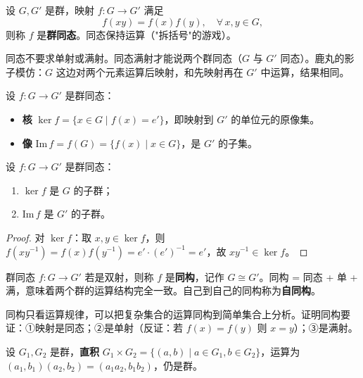\begin{definition}[群同态]
设 $G, G'$ 是群，映射 $f\colon G \to G'$ 满足
\[
  f(xy) = f(x)f(y), \quad \forall\, x, y \in G,
\]
则称 $f$ 是\textbf{群同态}。同态保持运算（"拆括号"的游戏）。
\end{definition}

\begin{note}
同态不要求单射或满射。同态满射才能说两个群同态（$G$ 与 $G'$ 同态）。鹿丸的影子模仿：$G$ 这边对两个元素运算后映射，和先映射再在 $G'$ 中运算，结果相同。
\end{note}

\begin{definition}[核与像（定义 1.15）]
设 $f\colon G \to G'$ 是群同态：
\begin{itemize}
  \item \textbf{核} $\ker f = \{x \in G \mid f(x) = e'\}$，即映射到 $G'$ 的单位元的原像集。
  \item \textbf{像} $\mathrm{Im}\, f = f(G) = \{f(x) \mid x \in G\}$，是 $G'$ 的子集。
\end{itemize}
\end{definition}

\begin{proposition}[核与像的结构]
设 $f\colon G \to G'$ 是群同态：
\begin{enumerate}
  \item $\ker f$ 是 $G$ 的子群；
  \item $\mathrm{Im}\, f$ 是 $G'$ 的子群。
\end{enumerate}
\end{proposition}

\begin{proof}
对 $\ker f$：取 $x, y \in \ker f$，则 $f(xy^{-1}) = f(x)f(y^{-1}) = e' \cdot (e')^{-1} = e'$，故 $xy^{-1} \in \ker f$。
\end{proof}

\begin{definition}[群同构]
群同态 $f\colon G \to G'$ 若是双射，则称 $f$ 是\textbf{同构}，记作 $G \cong G'$。同构 = 同态 + 单 + 满，意味着两个群的运算结构完全一致。自己到自己的同构称为\textbf{自同构}。
\end{definition}

\begin{note}
同构只看运算规律，可以把复杂集合的运算同构到简单集合上分析。证明同构要证：①映射是同态；②是单射（反证：若 $f(x) = f(y)$ 则 $x = y$）；③是满射。
\end{note}

\begin{definition}[群的直积（定义 1.18）]
设 $G_1, G_2$ 是群，\textbf{直积} $G_1 \times G_2 = \{(a,b) \mid a \in G_1, b \in G_2\}$，运算为 $(a_1, b_1)(a_2, b_2) = (a_1 a_2, b_1 b_2)$，仍是群。
\end{definition}

